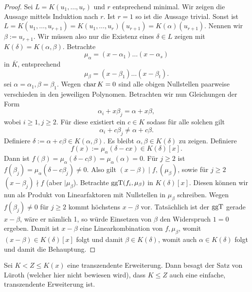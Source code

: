 \begin{proof}
    Sei $L = K(u_1, \hdots, u_r)$ und $r$ entsprechend minimal. Wir zeigen die Aussage mittels Induktion nach $r$. Ist $r = 1$ so ist die Aussage trivial. Sonst ist $L = K(u_1, \hdots, u_{r+1}) = K(u_1, \hdots, u_r)(u_{r+1}) = K(\alpha)(u_{r+1})$. Nennen wir $\beta := u_{r+1}$. Wir müssen also nur die Existenz eines $\delta \in L$ zeigen mit $K(\delta) = K(\alpha, \beta)$. Betrachte
    $$ \mu_\alpha = (x - \alpha_1) \hdots (x - \alpha_s) $$
    in $\overline{K}$, entsprechend
    $$ \mu_\beta = (x - \beta_1) \hdots (x - \beta_t). $$
    \obda sei $\alpha = \alpha_1, \beta = \beta_1$. Wegen $\operatorname{char} K = 0$ sind alle obigen Nullstellen paarweise verschieden in den jeweiligen Polynomen. Betrachten wir nun Gleichungen der Form
    $$ \alpha_i + x \beta_j = \alpha + x \beta, $$
    wobei $i \geq 1, j \geq 2$. Für diese existiert ein $c \in K$ sodass für alle solchen gilt
    $$ \alpha_i + c \beta_j \neq \alpha + c \beta. $$
    Definiere $\delta := \alpha + c \beta \in K(\alpha, \beta)$. Es bleibt $\alpha, \beta \in K(\delta)$ zu zeigen. Definiere
    $$ f(x) := \mu_\alpha (\delta - cx) \in K(\delta)[x]. $$
    Dann ist $f(\beta) = \mu_\alpha(\delta - c \beta) = \mu_\alpha(\alpha) = 0$. Für $j \geq 2$ ist $f(\beta_j) = \mu_\alpha(\delta - c \beta_j) \neq 0$. Also gilt $(x - \beta) \mid f, (\mu_\beta)$, sowie für $j \geq 2$ $(x-\beta_j) \nmid f$ (aber $\mid \mu_\beta$). Betrachte $\operatorname{ggT}(f_i, \mu_\beta)$ in $K(\delta)[x]$. Diesen können wir nun als Produkt von Linearfaktoren mit Nullstellen in $\mu_\beta$ schreiben. Wegen $f(\beta_j) \neq 0$ für $j \geq 2$ kommt höchstens $x-\beta$ vor. Tatsächlich ist der $\operatorname{ggT}$ gerade $x-\beta$, wäre er nämlich 1, so würde Einsetzen von $\beta$ den Widerspruch $1 = 0$ ergeben. Damit ist $x - \beta$ eine Linearkombination von $f, \mu_\beta$, womit $(x - \beta) \in K(\delta)[x]$ folgt und damit $\beta \in K(\delta)$, womit auch $\alpha \in K(\delta)$ folgt und damit die Behauptung.
\end{proof}

\begin{remark}
    Sei $K < Z \leq K(x)$ eine transzendente Erweiterung. Dann besagt der Satz von Lüroth (welcher hier nicht bewiesen wird), dass $K \leq Z$ auch eine einfache, transzendente Erweiterung ist.
\end{remark}